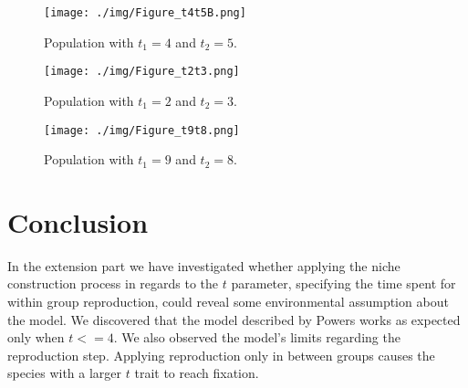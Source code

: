 \documentclass[runningheads]{llncs}
\begin{document}
\begin{figure}
\texttt{[image: ./img/Figure\_t4t5B.png]}
\caption{Population with $t_1 = 4$ and $t_2 = 5$.} \label{figt4t5B}
\end{figure}

\begin{figure}
\texttt{[image: ./img/Figure\_t2t3.png]}
\caption{Population with $t_1 = 2$ and $t_2 = 3$.} \label{figt2t3}
\end{figure}

\begin{figure}
\texttt{[image: ./img/Figure\_t9t8.png]}
\caption{Population with $t_1 = 9$ and $t_2 = 8$.} \label{figt9t8}
\end{figure}

\section{Conclusion}
In the extension part we have investigated whether applying the niche
construction process in regards to the $t$ parameter, specifying the
time spent for within group reproduction, could reveal some
environmental assumption about the model. We discovered that the model
described by Powers works as expected only when $t <= 4$. We also
observed the model's limits regarding the reproduction step. Applying
reproduction only in between groups causes the species with a larger
$t$ trait to reach fixation.
\end{document}
